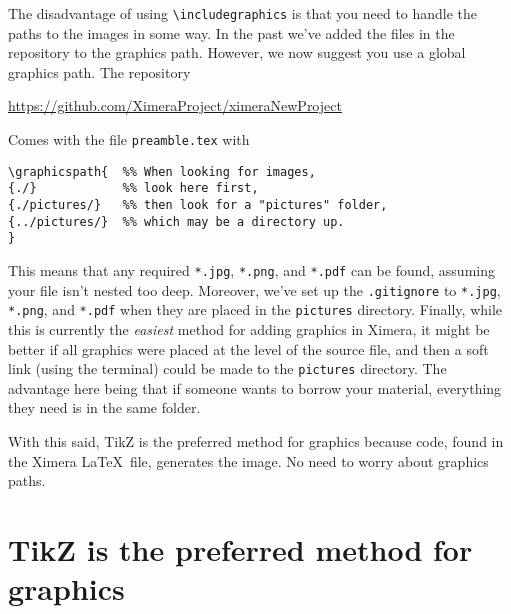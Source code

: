 \documentclass{ximera}
\begin{document}
The disadvantage of using \verb!\includegraphics! is that you need to handle
the paths to the images in some way. In the past we've added the files in the
repository to the graphics path. However, we now suggest you use a global
graphics path. The repository
\begin{center}
  \url{https://github.com/XimeraProject/ximeraNewProject}
\end{center}
Comes with the file \verb!preamble.tex! with
\begin{verbatim}
\graphicspath{  %% When looking for images,
{./}            %% look here first,
{./pictures/}   %% then look for a "pictures" folder,
{../pictures/}  %% which may be a directory up.
}
\end{verbatim}
This means that any required \verb!*.jpg!, \verb!*.png!, and \verb!*.pdf! can
be found, assuming your file isn't nested too deep.
Moreover, we've set up the \verb!.gitignore! to  \verb!*.jpg!,
\verb!*.png!, and \verb!*.pdf! when they are placed in the \verb!pictures!
directory. Finally, while this is currently the \textit{easiest} method for
adding graphics in Ximera, it might be better if all graphics were placed at
the level of the source file, and then a soft link (using the terminal) could
be made to the
\verb!pictures! directory. The advantage here being that if someone wants to
borrow your material, everything they need is in the same folder.

With this said, TikZ is the preferred method for graphics because code, found
in the Ximera \LaTeX\ file, generates the image. No need to worry about
graphics paths.

\section{TikZ is the preferred method for graphics}
\end{document}
